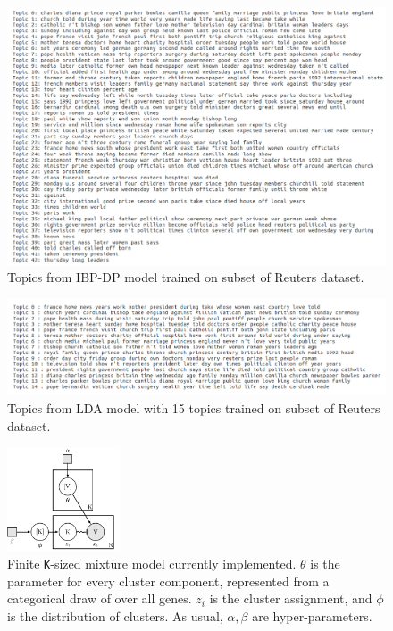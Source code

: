 \documentclass[11pt]{article}
\begin{document}
\begin{figure}
    \centering
    \includegraphics[width=1\textwidth]{ibptopics}
    \caption{Topics from IBP-DP model trained on subset of Reuters dataset.}
    \label{fig:ibptopics}
\end{figure}

\begin{figure}
    \centering
    \includegraphics[width=1\textwidth]{ldatopics}
    \caption{Topics from LDA model with 15 topics trained on subset of Reuters dataset.}
    \label{fig:ldatopics}
\end{figure}

\begin{figure}
    \centering
    \includegraphics[width=0.3\textwidth]{mixture}
    \caption{Finite \texttt{K}-sized mixture model currently implemented. $\theta$ is the parameter for every cluster component, represented from a categorical draw of over all genes. $z_i$ is the cluster assignment, and $\phi$ is the distribution of clusters. As usual, $\alpha, \beta$ are hyper-parameters.}
    \label{fig:plate}
\end{figure}
\end{document}
